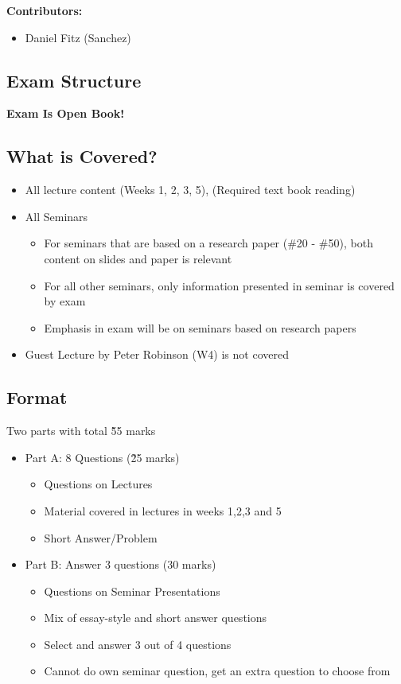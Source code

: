\documentclass[12pt, a4paper]{article}
\begin{document}
	\tableofcontents
	\vspace{2em}
	\textbf{Contributors:}
	\begin{itemize}
		\item Daniel Fitz (Sanchez)
	\end{itemize}
	\newpage
	
	\begin{multicols*}{2}
		
\section{Exam Structure}
\textbf{Exam Is Open Book!}
\subsection{What is Covered?}
\begin{itemize}
	\item All lecture content (Weeks 1, 2, 3, 5), (Required text book reading)
	\item All Seminars
	\begin{itemize}
		\item For seminars that are based on a research paper (\#20 - \#50), both content on slides and paper is relevant
		\item For all other seminars, only information presented in seminar is covered by exam
		\item Emphasis in exam will be on seminars based on research papers
	\end{itemize}
	\item Guest Lecture by Peter Robinson (W4) is not covered
\end{itemize}
\subsection{Format}
Two parts with total \~ 55 marks
\begin{itemize}
	\item Part A: 8 Questions (\~25 marks)
	\begin{itemize}
		\item Questions on Lectures
		\item Material covered in lectures in weeks 1,2,3 and 5
		\item Short Answer/Problem
	\end{itemize}
	\item Part B: Answer 3 questions (30 marks)
	\begin{itemize}
		\item Questions on Seminar Presentations
		\item Mix of essay-style and short answer questions
		\item Select and answer 3 out of 4 questions
		\item Cannot do own seminar question, get an extra question to choose from
	\end{itemize}
\end{itemize}

\end{multicols*}
\end{document}
